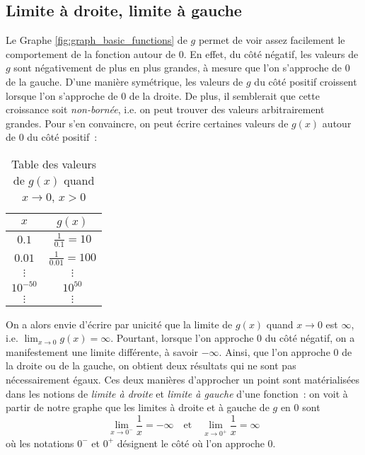 \subsection{Limite à droite, limite à gauche}
Le Graphe \ref{fig:graph_basic_functions} de $g$ permet de voir assez facilement le comportement de la fonction autour de $0$. En effet, du côté négatif, les valeurs de $g$ sont négativement de plus en plus grandes, à mesure que l'on s'approche de 0 de la gauche. D'une manière symétrique, les valeurs de $g$ du côté positif croissent lorsque l'on s'approche de 0 de la droite. De plus, il semblerait que cette croissance soit \emph{non-bornée}, i.e. on peut trouver des valeurs arbitrairement grandes. Pour s'en convaincre, on peut écrire certaines valeurs de $g(x)$ autour de 0 du côté positif~:
\begin{table}[H]
    \centering
    \begin{tabular}{|c|c|}
        \hline
        $x$ & $g(x)$ \\
        \hline
        $0.1$ & $\frac{1}{0.1} = 10$ \\
        \hline
        $0.01$ & $\frac{1}{0.01} = 100$ \\
        \hline
        $\vdots$ & $\vdots$ \\
        \hline
        $10^{-50}$ & $10^{50}$ \\
        \hline
        $\vdots$ & $\vdots$ \\
        \hline
    \end{tabular}
    \caption{Table des valeurs de $g(x)$ quand $x \to 0$, $x > 0$}
    \label{tab:singularity_values}
\end{table}
On a alors envie d'écrire par unicité que la limite de $g(x)$ quand $x \to 0$ est $\infty$, i.e. $\displaystyle\lim_{x \to 0} g(x) = \infty$. Pourtant, lorsque l'on approche 0 du côté négatif, on a manifestement une limite différente, à savoir $-\infty$. Ainsi, que l'on approche $0$ de la droite ou de la gauche, on obtient deux résultats qui ne sont pas nécessairement égaux. Ces deux manières d'approcher un point sont matérialisées dans les notions de \emph{limite à droite} et \emph{limite à gauche} d'une fonction~: on voit à partir de notre graphe que les limites à droite et à gauche de $g$ en $0$ sont
\begin{equation}
\lim_{x \to 0^{-}} \frac{1}{x} = -\infty \quad \mathrm{ et } \quad \lim_{x \to 0^{+}} \frac{1}{x} = \infty
\end{equation}
où les notations $0^{-}$ et $0^{+}$ désignent le côté où l'on approche $0$.

